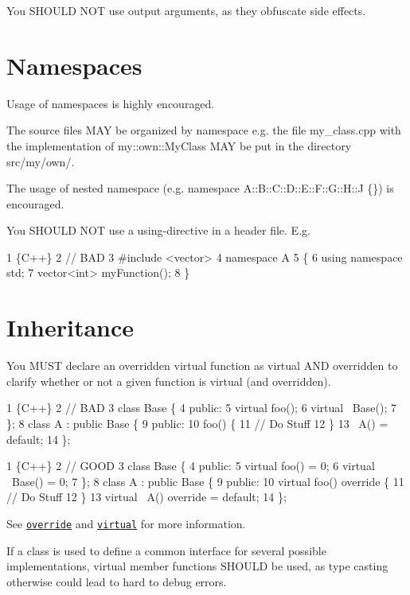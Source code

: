 You S\+H\+O\+U\+LD N\+OT use output arguments, as they obfuscate side effects.

\section*{Namespaces}

Usage of namespaces is highly encouraged.

The source files M\+AY be organized by namespace e.\+g. the file {\ttfamily my\+\_\+class.\+cpp} with the implementation of {\ttfamily my\+::own\+::\+My\+Class} M\+AY be put in the directory {\ttfamily src/my/own/}.

The usage of nested namespace (e.\+g. {\ttfamily namespace A\+::\+B\+::\+C\+::\+D\+::\+E\+::\+F\+::\+G\+::\+H\+::J \{\}}) is encouraged.

You S\+H\+O\+U\+LD N\+OT use a using-\/directive in a header file. E.\+g. 
\begin{DoxyCode}
1 \{C++\}
2 // BAD
3 #include <vector>
4 namespace A
5 \{
6     using namespace std;
7     vector<int> myFunction();
8 \}
\end{DoxyCode}


\section*{Inheritance}

You M\+U\+ST declare an overridden virtual function as virtual A\+ND overridden to clarify whether or not a given function is virtual (and overridden). 
\begin{DoxyCode}
1 \{C++\}
2 // BAD
3 class Base \{
4     public:
5     virtual foo();
6     virtual ~Base();
7 \};
8 class A : public Base \{
9     public:
10     foo() \{
11         // Do Stuff
12     \}
13     ~A() = default;
14 \};
\end{DoxyCode}
 
\begin{DoxyCode}
1 \{C++\}
2 // GOOD
3 class Base \{
4     public:
5     virtual foo() = 0;
6     virtual ~Base() = 0;
7 \};
8 class A : public Base \{
9     public:
10     virtual foo() override \{
11         // Do Stuff
12     \}
13     virtual ~A() override = default;
14 \};
\end{DoxyCode}
 See \href{https://en.cppreference.com/w/cpp/language/override}{\tt override} and \href{https://en.cppreference.com/w/cpp/language/virtual}{\tt virtual} for more information.

If a class is used to define a common interface for several possible implementations, virtual member functions S\+H\+O\+U\+LD be used, as type casting otherwise could lead to hard to debug errors.

